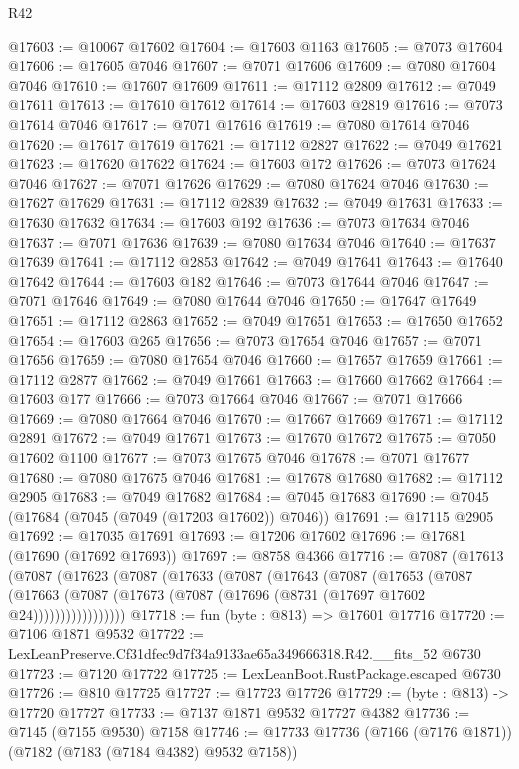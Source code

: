 \begin{lexlean}{R42}
\begin{coremodule}
{@17603 := @10067 @17602
@17604 := @17603 @1163
@17605 := @7073 @17604
@17606 := @17605 @7046
@17607 := @7071 @17606
@17609 := @7080 @17604 @7046
@17610 := @17607 @17609
@17611 := @17112 @2809
@17612 := @7049 @17611
@17613 := @17610 @17612
@17614 := @17603 @2819
@17616 := @7073 @17614 @7046
@17617 := @7071 @17616
@17619 := @7080 @17614 @7046
@17620 := @17617 @17619
@17621 := @17112 @2827
@17622 := @7049 @17621
@17623 := @17620 @17622
@17624 := @17603 @172
@17626 := @7073 @17624 @7046
@17627 := @7071 @17626
@17629 := @7080 @17624 @7046
@17630 := @17627 @17629
@17631 := @17112 @2839
@17632 := @7049 @17631
@17633 := @17630 @17632
@17634 := @17603 @192
@17636 := @7073 @17634 @7046
@17637 := @7071 @17636
@17639 := @7080 @17634 @7046
@17640 := @17637 @17639
@17641 := @17112 @2853
@17642 := @7049 @17641
@17643 := @17640 @17642
@17644 := @17603 @182
@17646 := @7073 @17644 @7046
@17647 := @7071 @17646
@17649 := @7080 @17644 @7046
@17650 := @17647 @17649
@17651 := @17112 @2863
@17652 := @7049 @17651
@17653 := @17650 @17652
@17654 := @17603 @265
@17656 := @7073 @17654 @7046
@17657 := @7071 @17656
@17659 := @7080 @17654 @7046
@17660 := @17657 @17659
@17661 := @17112 @2877
@17662 := @7049 @17661
@17663 := @17660 @17662
@17664 := @17603 @177
@17666 := @7073 @17664 @7046
@17667 := @7071 @17666
@17669 := @7080 @17664 @7046
@17670 := @17667 @17669
@17671 := @17112 @2891
@17672 := @7049 @17671
@17673 := @17670 @17672
@17675 := @7050 @17602 @1100
@17677 := @7073 @17675 @7046
@17678 := @7071 @17677
@17680 := @7080 @17675 @7046
@17681 := @17678 @17680
@17682 := @17112 @2905
@17683 := @7049 @17682
@17684 := @7045 @17683
@17690 := @7045 (@17684 (@7045 (@7049 (@17203 @17602)) @7046))
@17691 := @17115 @2905
@17692 := @17035 @17691
@17693 := @17206 @17602
@17696 := @17681 (@17690 (@17692 @17693))
@17697 := @8758 @4366
@17716 := @7087
    (@17613
      (@7087
        (@17623
          (@7087
            (@17633
              (@7087
                (@17643
                  (@7087
                    (@17653
                      (@7087
                        (@17663
                          (@7087 (@17673 (@7087 (@17696 (@8731 (@17697 @17602 @24)))))))))))))))))
@17718 := fun (byte : @813) => @17601 @17716
@17720 := @7106 @1871 @9532
@17722 := LexLeanPreserve.Cf31dfec9d7f34a9133ae65a349666318.R42.__fits_52 @6730
@17723 := @7120 @17722
@17725 := LexLeanBoot.RustPackage.escaped @6730
@17726 := @810 @17725
@17727 := @17723 @17726
@17729 := (byte : @813) -> @17720 @17727
@17733 := @7137 @1871 @9532 @17727 @4382
@17736 := @7145 (@7155 @9530) @7158
@17746 := @17733 @17736 (@7166 (@7176 @1871)) (@7182 (@7183 (@7184 @4382) @9532 @7158))
}
\end{coremodule}
\end{lexlean}
